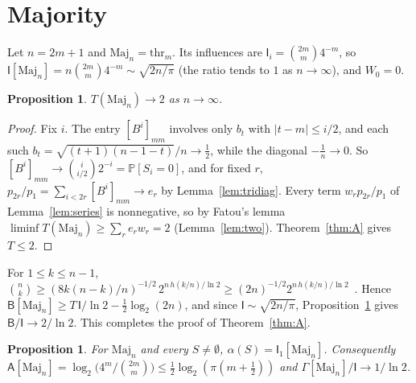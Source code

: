 \documentclass[11pt]{amsart}
\newtheorem{proposition}[lemma]{Proposition}
\theoremstyle{remark}
\renewcommand{\P}{\mathbb P}
\newcommand{\I}{\mathsf I}
\newcommand{\thr}{\mathrm{thr}}
\begin{document}
\section{Majority}\label{sec:sharp}

Let $n=2m+1$ and $\mathrm{Maj}_n=\thr_m$. Its influences are $\I_i=\binom{2m}m4^{-m}$, so $\I[\mathrm{Maj}_n]=n\binom{2m}m4^{-m}\sim\sqrt{2n/\pi}$ (the ratio tends to $1$ as $n\to\infty$), and $W_0=0$.

\begin{proposition}\label{prop:majT}
$T(\mathrm{Maj}_n)\to2$ as $n\to\infty$.
\end{proposition}

\begin{proof}
Fix $i$. The entry $[B^i]_{mm}$ involves only $b_t$ with $|t-m|\le i/2$, and each such $b_t=\sqrt{(t+1)(n-1-t)}/n\to\frac12$, while the diagonal $-\frac1n\to0$. So $[B^i]_{mm}\to\binom i{i/2}2^{-i}=\P[S_i=0]$, and for fixed $r$, $p_{2r}/p_1=\sum_{i<2r}[B^i]_{mm}\to e_r$ by Lemma~\ref{lem:tridiag}. Every term $w_rp_{2r}/p_1$ of Lemma~\ref{lem:series} is nonnegative, so by Fatou's lemma $\liminf T(\mathrm{Maj}_n)\ge\sum_re_rw_r=2$ (Lemma~\ref{lem:two}). Theorem~\ref{thm:A} gives $T\le2$.
\end{proof}

For $1\le k\le n-1$, $\binom nk\ge(8k(n-k)/n)^{-1/2}\,2^{n\,h(k/n)/\ln2}\ge(2n)^{-1/2}2^{n\,h(k/n)/\ln2}$~\cite[Chapter~10, Lemma~7]{MS77}. Hence $\mathsf B[\mathrm{Maj}_n]\ge T\,\I/\ln2-\frac12\log_2(2n)$, and since $\I\sim\sqrt{2n/\pi}$, Proposition~\ref{prop:majT} gives $\mathsf B/\I\to2/\ln2$. This completes the proof of Theorem~\ref{thm:A}.

\begin{proposition}\label{prop:majG}
For $\mathrm{Maj}_n$ and every $S\ne\emptyset$, $\alpha(S)=\I_1[\mathrm{Maj}_n]$. Consequently $\mathsf A[\mathrm{Maj}_n]=\log_2\bigl(4^m/\binom{2m}m\bigr)\le\frac12\log_2(\pi(m+\frac12))$ and $\Gamma[\mathrm{Maj}_n]/\I\to1/\ln2$.
\end{proposition}
\end{document}
